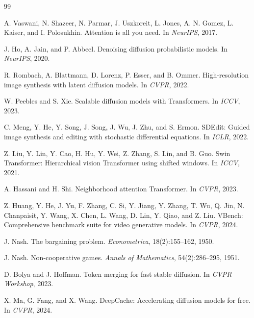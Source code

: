 \documentclass[10pt,twocolumn]{article}
\begin{document}
\begin{thebibliography}{99}

A. Vaswani, N. Shazeer, N. Parmar, J. Uszkoreit, L. Jones, A. N. Gomez, L. Kaiser, and I. Polosukhin.
Attention is all you need.
In \emph{NeurIPS}, 2017.

J. Ho, A. Jain, and P. Abbeel.
Denoising diffusion probabilistic models.
In \emph{NeurIPS}, 2020.

R. Rombach, A. Blattmann, D. Lorenz, P. Esser, and B. Ommer.
High-resolution image synthesis with latent diffusion models.
In \emph{CVPR}, 2022.

W. Peebles and S. Xie.
Scalable diffusion models with Transformers.
In \emph{ICCV}, 2023.

C. Meng, Y. He, Y. Song, J. Song, J. Wu, J. Zhu, and S. Ermon.
SDEdit: Guided image synthesis and editing with stochastic differential equations.
In \emph{ICLR}, 2022.

Z. Liu, Y. Lin, Y. Cao, H. Hu, Y. Wei, Z. Zhang, S. Lin, and B. Guo.
Swin Transformer: Hierarchical vision Transformer using shifted windows.
In \emph{ICCV}, 2021.

A. Hassani and H. Shi.
Neighborhood attention Transformer.
In \emph{CVPR}, 2023.

Z. Huang, Y. He, J. Yu, F. Zhang, C. Si, Y. Jiang, Y. Zhang, T. Wu, Q. Jin, N. Chanpaisit, Y. Wang, X. Chen, L. Wang, D. Lin, Y. Qiao, and Z. Liu.
VBench: Comprehensive benchmark suite for video generative models.
In \emph{CVPR}, 2024.

J. Nash.
The bargaining problem.
\emph{Econometrica}, 18(2):155--162, 1950.

J. Nash.
Non-cooperative games.
\emph{Annals of Mathematics}, 54(2):286--295, 1951.

D. Bolya and J. Hoffman.
Token merging for fast stable diffusion.
In \emph{CVPR Workshop}, 2023.

X. Ma, G. Fang, and X. Wang.
DeepCache: Accelerating diffusion models for free.
In \emph{CVPR}, 2024.

\end{thebibliography}
\end{document}
